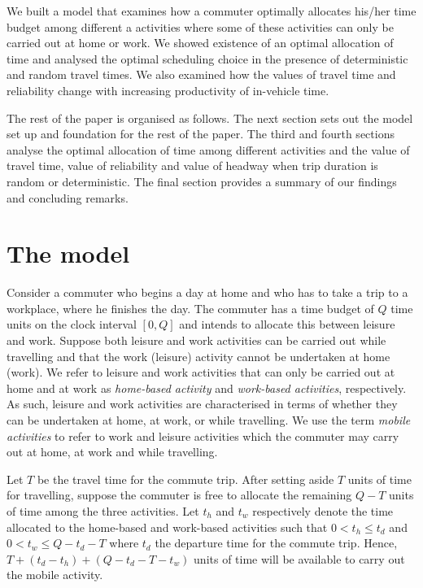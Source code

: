 \documentclass[12pt,a4paper,british]{article}
\begin{document}
We built a model that examines how a commuter optimally allocates his/her time budget among different a activities where some of these activities can only be carried out at home or work. We showed existence of an optimal allocation of time and analysed the optimal scheduling choice in the presence of deterministic and random travel times. We also examined how the values of travel time and reliability change with increasing productivity of in-vehicle time.

The rest of the paper is organised as follows. The next section sets out the model set up and foundation for the rest of the paper. The third and fourth sections analyse the optimal allocation of time among different activities and the value of travel time, value of reliability and value of headway when trip duration is random or deterministic. The final section provides a summary of our findings and concluding remarks.

\section{The model}
\label{sec:model1}

Consider a commuter who begins a day at home and who has to take a trip to a workplace, where he finishes the day. The commuter has a time budget of $Q$ time units on the clock interval $[0, Q]$ and intends to allocate this between leisure and work. Suppose both leisure and work activities can be carried out while travelling and that the work (leisure) activity cannot be undertaken at home (work). We refer to leisure and work activities that can only be carried out at home and at work as \emph{home-based activity} and \emph{work-based activities}, respectively. As such, leisure and work activities are characterised in terms of whether they can be undertaken at home, at work, or while travelling. We use the term \textit{mobile activities} to refer to work and leisure activities which the commuter may carry out at home, at work and while travelling.

Let $T$ be the travel time for the commute trip. After setting aside $T$ units of time for travelling, suppose the commuter is free to allocate the remaining $Q-T$ units of time among the three activities. Let $t_{h}$ and $t_{w}$ respectively denote the time allocated to the home-based and work-based activities such that $0<t_{h}\leq t_{d}$ and $0<t_{w}\leq Q-t_{d}-T$ where $t_d$ the departure time for the commute trip. Hence,  $T+\left(t_{d}-t_{h}\right)+\left(Q-t_{d}-T-t_{w}\right)$ units of time will be available to carry out the mobile activity. 
\end{document}
